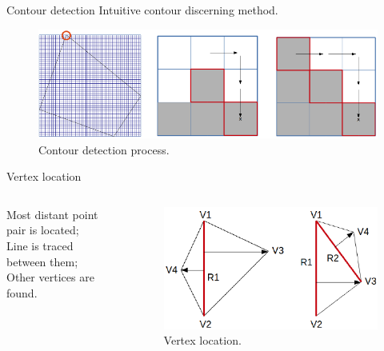 \documentclass[10pt]{beamer}
\begin{document}

\begin{frame}[fragile]{Contour detection}
  Intuitive contour discerning method.
  \begin{figure}
    \centering
    \includegraphics[scale=0.35]{contour}
    \caption{Contour detection process.}
  \end{figure}
\end{frame}


\begin{frame}[fragile]{Vertex location}
  \begin{columns}
      Most distant point pair is located;\\
      Line is traced between them;\\
      Other vertices are found.
      \begin{figure}
        \centering
        \includegraphics[scale=0.35]{vertex}
        \caption{Vertex location.}
      \end{figure}
  \end{columns}
\end{frame}

\end{document}
